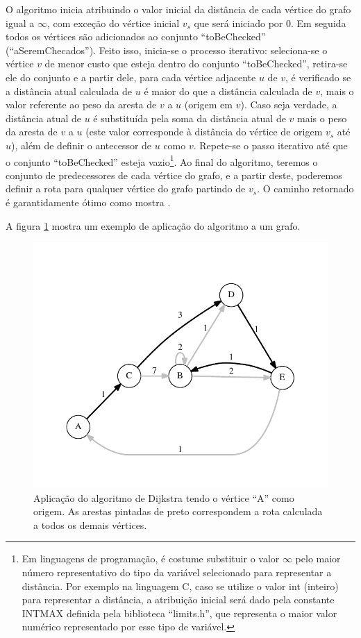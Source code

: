 O algoritmo inicia atribuindo o valor inicial da distância de cada vértice do grafo igual a $\infty$, com exceção do vértice inicial $v_{s}$ que será iniciado por 0. Em seguida todos os vértices são adicionados ao conjunto ``toBeChecked'' (``aSeremChecados''). Feito isso, inicia-se o processo iterativo: seleciona-se o vértice $v$ de menor custo que esteja dentro do conjunto ``toBeChecked'', retira-se ele do conjunto e a partir dele, para cada vértice adjacente $u$ de $v$, é verificado se a distância atual calculada de $u$ é maior do que a distância calculada de $v$, mais o valor referente ao peso da aresta de $v$ a $u$ (origem em $v$). Caso seja verdade, a distância atual de $u$ é substituída pela soma da distância atual de $v$ mais o peso da aresta de $v$ a $u$ (este valor corresponde à distância do vértice de origem $v_{s}$ até $u$), além de definir o antecessor de $u$ como $v$. Repete-se o passo iterativo até que o conjunto ``toBeChecked'' esteja vazio\footnote{Em linguagens de programação, é costume substituir o valor $\infty$ pelo maior número representativo do tipo da variável selecionado para representar a distância. Por exemplo na linguagem C, caso se utilize o valor int (inteiro) para representar a distância, a atribuição inicial será dado pela constante INT\underline{\space}MAX  definida pela biblioteca ``limits.h'', que representa o maior valor numérico representado por esse tipo de variável.}.
\newpage
Ao final do algoritmo, teremos o conjunto de predecessores de cada vértice do grafo, e a partir deste, poderemos definir a rota para qualquer vértice do grafo partindo de $v_{s}$. O caminho retornado é garantidamente ótimo como mostra .

A figura \ref{fig-dijkstra-algoritmo-grafo} mostra um exemplo de aplicação do algoritmo a um grafo.

\begin{figure}[H]
\centering
\includegraphics[width=1.\textwidth]{figuras/grafo-dijkstra} 
\caption{Aplicação do algoritmo de Dijkstra tendo o vértice ``A'' como origem. As arestas pintadas de preto correspondem a rota calculada a todos os demais vértices.}
\label{fig-dijkstra-algoritmo-grafo}
\end{figure}

